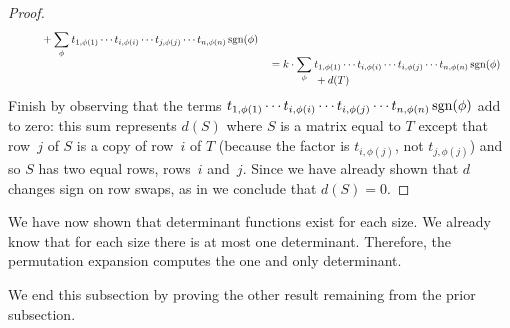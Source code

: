 \begin{proof}
\begin{align*}
\begin{aligned}[t]
         &\hbox{}\qquad\quad\hbox{}
            +\smash[b]{\sum_{\phi}}\:
            t_{1,\phi(1)}\cdots t_{i,\phi(i)}
            \cdots t_{j,\phi(j)}\cdots t_{n,\phi(n)}
                                 \sgn(\phi)        
     \end{aligned}                                               \\[1.25ex]
  &=\begin{aligned}[t]
       &k\cdot \smash[b]{\sum_{\smash{\phi}}}\:
            t_{1,\phi(1)}\cdots t_{i,\phi(i)}
            \cdots t_{i,\phi(j)}\cdots t_{n,\phi(n)}
                                 \sgn(\phi)          \\  %
       &\hbox{}\qquad\quad\hbox{}
             +d(T)          
     \end{aligned}
\end{align*}
Finish by observing that the terms
\( t_{1,\phi(1)}\cdots t_{i,\phi(i)} \cdots t_{i,\phi(j)}\cdots t_{n,\phi(n)}
   \operatorname{sgn}(\phi)  \) add to zero:
this sum represents \( d(S) \) where \( S \) is a matrix equal to  \( T \)
except that row~$j$ of $S$ is a copy of row~$i$ of $T$ 
(because the factor is \( t_{i,\phi(j)} \), not \( t_{j,\phi(j)} \))
and so $S$ has two equal rows, rows~$i$ and~$j$.
Since we have already shown that $d$ changes sign on row swaps,
as in  we conclude that $d(S)=0$.
\end{proof}

We have now shown that determinant functions exist for each size.
We already know that for each size there is at most one
determinant.
Therefore, the permutation expansion
computes the one and only determinant.

We end this subsection by proving the other result 
remaining from the prior subsection.

